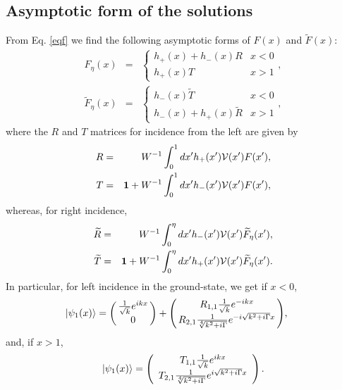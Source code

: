 \subsection{Asymptotic form of the solutions}
%
From Eq. \eqref{eqf} we find the following asymptotic forms of  $F(x)$ and $\widetilde{F}(x)$:
%
\begin{eqnarray}
	F_{\eta}(x)&=& \begin{cases}
	h_{+}(x)+h_{-}(x)R  & x<0  \\ h_{+}(x)T & x>1
	\end{cases},
	\nonumber\\
	\widetilde{F}_{\eta}(x)&=&\begin{cases}
	h_{-}(x)\widetilde{T}  &  x<0  \\ h_{-}(x)+h_{+}(x)\widetilde{R} & x>1
	\end{cases},
\end{eqnarray}
%
where the $R$ and $T$ matrices for incidence from the left are given by
%
\begin{eqnarray}
	R &=& W^{-1}\int_{0}^{1} dx' h_{+}(x'){\cal V}(x')F (x'),
	\nonumber\\
	T &=& \mathbf{1}+W^{-1}\int_{0}^{1} dx' h_{-}(x'){\cal V}(x')F (x'),
\end{eqnarray}
%
whereas, for right incidence,
%
\begin{eqnarray}
	\widetilde{R} &=& W^{-1}\int_{0}^{\eta} dx' h_{-}(x'){\cal V}(x')\widetilde{F}_{\eta}(x'),
	\nonumber\\
	\widetilde{T} &=& \mathbf{1}+W^{-1}\int_{0}^{\eta} dx' h_{+}(x'){\cal V}(x')\widetilde{F}_{\eta}(x').
\end{eqnarray}
%
In particular, for left incidence  in the ground-state, we get  if $x < 0$,
%
\begin{eqnarray}
	\hspace*{-.5cm}|\psi_1 (x)\ra = \left(\!\!\begin{array}{c} \frac{1}{\sqrt{k}}e^{i k x} \\ 0\end{array}\!\!\right)
	+ \left(\!\!\begin{array}{c}
	R_{1,1} \frac{1}{\sqrt{k}}e^{-i k x} \\
	R_{2,1} \frac{1}{\sqrt[4]{k^2+i \Gamma}} e^{- i \sqrt{k^2+i \Gamma} x}
	\end{array}\!\!\right)\!,
	\label{as-}
\end{eqnarray}
%
and, if $x>1$,
%
\begin{eqnarray}
	|\psi_1 (x)\ra = \left(\begin{array}{c}
	T_{1,1} \frac{1}{\sqrt{k}}e^{i k x} \\
	T_{2,1} \frac{1}{\sqrt[4]{k^2+i \Gamma}} e^{i \sqrt{k^2+i \Gamma} x}
	\end{array}\right).
	\label{as+}
\end{eqnarray}
